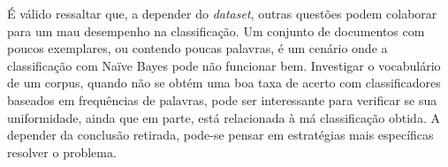 É válido ressaltar que, a depender do \emph{dataset}, outras questões podem colaborar para um mau desempenho na classificação. Um conjunto de documentos com poucos exemplares, ou contendo poucas palavras, é um cenário onde a classificação com Naïve Bayes pode não funcionar bem. Investigar o vocabulário de um corpus, quando não se obtém uma boa taxa de acerto com classificadores baseados em frequências de palavras, pode ser interessante para verificar se sua uniformidade, ainda que em parte, está relacionada à má classificação obtida. A depender da conclusão retirada, pode-se pensar em estratégias mais específicas resolver o problema. 
 












